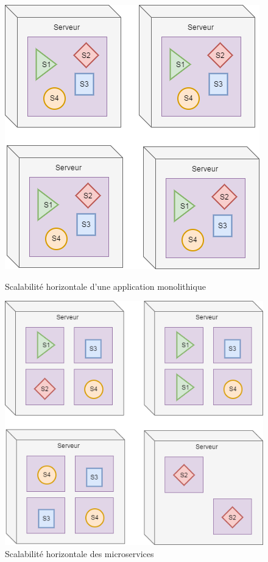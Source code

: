 \begin{figure}[H]
    \begin{minipage}{.5\textwidth}
    \raggedright
		\includegraphics[scale=0.55]{images/travailNeuflizeOBC/architecture/monolithScale.png}
		\caption{Scalabilité horizontale d'une application monolithique}
		\label{monolithScale}
    \end{minipage}%
    \hspace{1cm}
    \begin{minipage}{.5\textwidth}
        \includegraphics[scale=0.5]{images/travailNeuflizeOBC/architecture/microservicesScale.png}
		\caption{Scalabilité horizontale des microservices}
		\label{microservicesScale}
    \end{minipage}
\end{figure}

